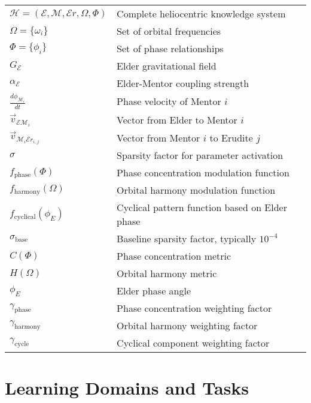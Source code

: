 \begin{tabular}{p{3cm} p{12cm}}
$\mathcal{H} = (\mathcal{E}, \mathcal{M}, \mathcal{E}r, \Omega, \Phi)$ & Complete heliocentric knowledge system \\
$\Omega = \{\omega_i\}$ & Set of orbital frequencies \\
$\Phi = \{\phi_i\}$ & Set of phase relationships \\
$G_{\mathcal{E}}$ & Elder gravitational field \\
$\alpha_{\mathcal{E}}$ & Elder-Mentor coupling strength \\
$\frac{d\phi_{\mathcal{M}_i}}{dt}$ & Phase velocity of Mentor $i$ \\
$\vec{v}_{\mathcal{E}\mathcal{M}_i}$ & Vector from Elder to Mentor $i$ \\
$\vec{v}_{\mathcal{M}_i\mathcal{E}r_{i,j}}$ & Vector from Mentor $i$ to Erudite $j$ \\
$\sigma$ & Sparsity factor for parameter activation \\
$f_{\text{phase}}(\Phi)$ & Phase concentration modulation function \\
$f_{\text{harmony}}(\Omega)$ & Orbital harmony modulation function \\
$f_{\text{cyclical}}(\phi_E)$ & Cyclical pattern function based on Elder phase \\
$\sigma_{\text{base}}$ & Baseline sparsity factor, typically $10^{-4}$ \\
$C(\Phi)$ & Phase concentration metric \\
$H(\Omega)$ & Orbital harmony metric \\
$\phi_E$ & Elder phase angle \\
$\gamma_{\text{phase}}$ & Phase concentration weighting factor \\
$\gamma_{\text{harmony}}$ & Orbital harmony weighting factor \\
$\gamma_{\text{cycle}}$ & Cyclical component weighting factor \\
\end{tabular}

\newpage
\section*{Learning Domains and Tasks}

